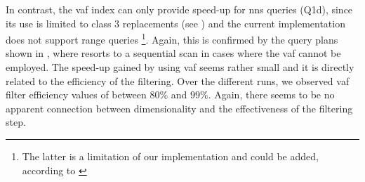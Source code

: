In contrast, the \acrshort{vaf} index can only provide speed-up for \acrshort{nns} queries (Q1d), since its use is limited to class 3 replacements (see ) and the current implementation does not support range queries \footnote{ The latter is a limitation of our implementation and could be added, according to \cite{Weber:1998Va}}. Again, this is confirmed by the query plans shown in , where \cottontail{} resorts to a sequential scan in cases where the \acrshort{vaf} cannot be employed. The speed-up gained by using \acrshort{vaf} seems rather small and it is directly related to the efficiency of the filtering. Over the different runs, we observed \acrshort{vaf} filter efficiency values of between $80\%$ and $99\%$. Again, there seems to be no apparent connection between dimensionality and the effectiveness of the filtering step.


